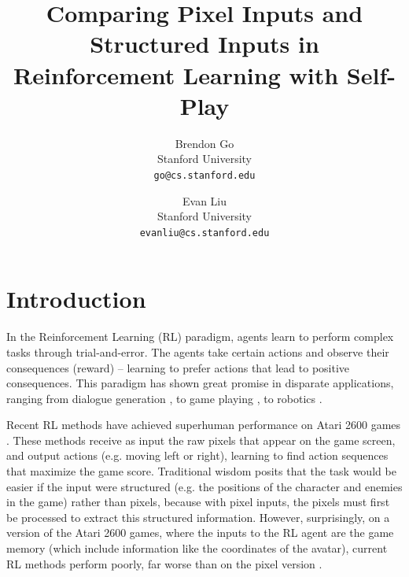 \documentclass[10pt,twocolumn,letterpaper]{article}
\begin{document}
\title{Comparing Pixel Inputs and Structured Inputs in Reinforcement Learning with Self-Play}

\author{Brendon Go\\
Stanford University\\
{\tt\small go@cs.stanford.edu}
\and
Evan Liu\\
Stanford University\\
{\tt\small evanliu@cs.stanford.edu}
}

\maketitle

\section{Introduction}

In the Reinforcement Learning (RL) paradigm, agents learn to perform complex
tasks through trial-and-error. The agents take certain actions and observe their
consequences (reward) -- learning to prefer actions that lead to positive
consequences.  This paradigm has shown great promise in disparate
applications, ranging from dialogue generation \citep{dialogue2016}, to game
playing \citep{mnih2015human}, to robotics \citep{robotics2016}.

Recent RL methods have achieved superhuman performance on Atari 2600 games
\citep{bellemare2013arcade}. These methods receive as input the raw pixels that
appear on the game screen, and output actions (e.g. moving left or right),
learning to find action sequences that maximize the game score. Traditional
wisdom posits that the task would be easier if the input were structured (e.g.
the positions of the character and enemies in the game) rather than pixels,
because with pixel inputs, the pixels must first be processed to extract this
structured information. However, surprisingly, on a version of the Atari 2600
games, where the inputs to the RL agent are the game memory (which include
information like the coordinates of the avatar), current RL methods perform
poorly, far worse than on the pixel version \citep{atariRAM}.
\end{document}
